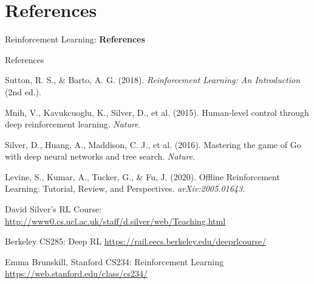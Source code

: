 \section{References}
\begin{frame}{}
    \LARGE Reinforcement Learning: \textbf{References}
\end{frame}

\begin{frame}[allowframebreaks]{References}
    \begin{thebibliography}{99}
            Sutton, R. S., \& Barto, A. G. (2018). \emph{Reinforcement Learning: An Introduction} (2nd ed.).

            Mnih, V., Kavukcuoglu, K., Silver, D., et al. (2015). Human-level control through deep reinforcement learning. \emph{Nature}.

            Silver, D., Huang, A., Maddison, C. J., et al. (2016). Mastering the game of Go with deep neural networks and tree search. \emph{Nature}.

            Levine, S., Kumar, A., Tucker, G., \& Fu, J. (2020). Offline Reinforcement Learning: Tutorial, Review, and Perspectives. \emph{arXiv:2005.01643}.

            David Silver’s RL Course: \url{http://www0.cs.ucl.ac.uk/staff/d.silver/web/Teaching.html}

            Berkeley CS285: Deep RL \url{https://rail.eecs.berkeley.edu/deeprlcourse/}

            Emma Brunskill, Stanford CS234: Reinforcement Learning \url{https://web.stanford.edu/class/cs234/}
    \end{thebibliography}
\end{frame}
